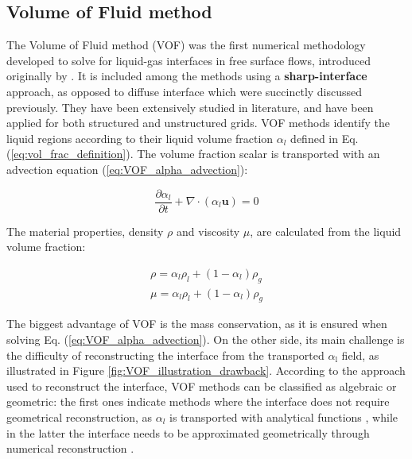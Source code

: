 \subsection{Volume of Fluid method}
\label{subsec:ch2_VOF}


The Volume of Fluid method (VOF) was the first numerical methodology developed to solve for liquid-gas interfaces in free surface flows, introduced originally by . It is included among the methods using a \textbf{sharp-interface} approach, as opposed to diffuse interface which were succinctly discussed previously. They have been extensively studied in literature, and have been applied for both structured  and unstructured  grids. VOF methods identify the liquid regions according to their liquid volume fraction $\alpha_l$ defined in Eq. (\ref{eq:vol_frac_definition}). The volume fraction scalar is transported with an advection equation (\ref{eq:VOF_alpha_advection}):

\begin{equation}
	\label{eq:VOF_alpha_advection}
	\frac{\partial \alpha_l}{\partial t} + \nabla \cdot \left( \alpha_l \boldsymbol{u} \right) = 0
\end{equation}

The material properties, density $\rho$ and viscosity $\mu$, are calculated from the liquid volume fraction:

\begin{subequations}
\begin{align}
\rho = \alpha_l \rho_l + \left( 1 - \alpha_l \right) \rho_g  \\
\mu = \alpha_l \rho_l + \left( 1 - \alpha_l \right) \rho_g
\end{align}
\end{subequations}


The biggest advantage of VOF is the mass conservation, as it is ensured when solving Eq. (\ref{eq:VOF_alpha_advection}). On the other side, its main challenge is the difficulty of reconstructing the interface from the transported $\alpha_\mathrm{l}$ field, as illustrated in Figure \ref{fig:VOF_illustration_drawback}. According to the approach used to reconstruct the interface, VOF methods can be classified as algebraic or geometric: the first ones indicate methods where the interface does not require geometrical reconstruction, as $\alpha_l$ is transported with analytical functions , while in the latter the interface needs to be approximated geometrically through numerical reconstruction .



